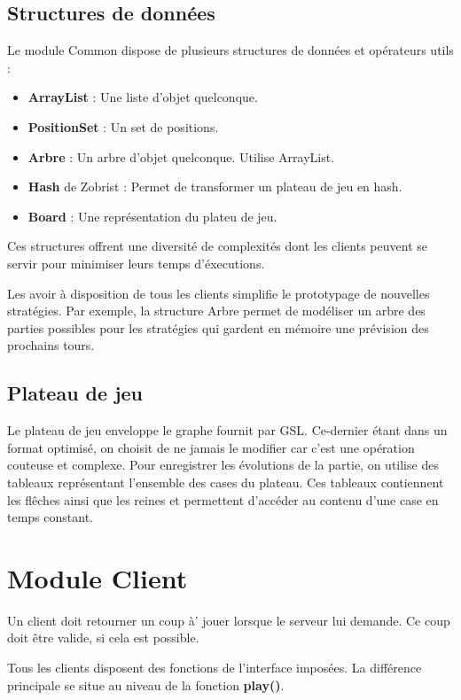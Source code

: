 \documentclass{article}
\begin{document}
\subsection{Structures de donn\'ees}
Le module Common dispose de plusieurs structures de donn\'ees et op\'erateurs utils :
\begin{itemize}
    \item \textbf{ArrayList} : Une liste d'objet quelconque.
    \item \textbf{PositionSet} : Un set de positions.
    \item \textbf{Arbre} : Un arbre d'objet quelconque. Utilise ArrayList.
    \item \textbf{Hash} de Zobrist : Permet de transformer un plateau de jeu en hash.
    \item \textbf{Board} : Une représentation du plateu de jeu.
\end{itemize}

Ces structures offrent une diversit\'e de complexit\'es dont les clients 
peuvent se servir pour minimiser leurs temps d'\'executions.

Les avoir \`a disposition de tous les clients simplifie le prototypage de nouvelles strat\'egies.
Par exemple, la structure Arbre permet de mod\'eliser un arbre des parties possibles pour les 
stratégies qui gardent en m\'emoire une pr\'evision des prochains tours.

\subsection{Plateau de jeu}
Le plateau de jeu enveloppe le graphe fournit par GSL.
Ce-dernier \'etant dans un format optimis\'e, on choisit de ne jamais 
le modifier car c'est une op\'eration couteuse et complexe. Pour 
enregistrer les \'evolutions de la partie, on utilise des 
tableaux repr\'esentant l'ensemble des cases du plateau.
Ces tableaux contiennent les fl\^eches ainsi que les reines 
et permettent d'acc\'eder au contenu d'une case en temps constant.


\section{Module Client}
Un client doit retourner un coup \`a' jouer lorsque le serveur lui demande.
Ce coup doit \^etre valide, si cela est possible.

Tous les clients disposent des fonctions de l'interface impos\'ees.
La diff\'erence principale se situe au niveau de la fonction \textbf{play()}.
\end{document}
